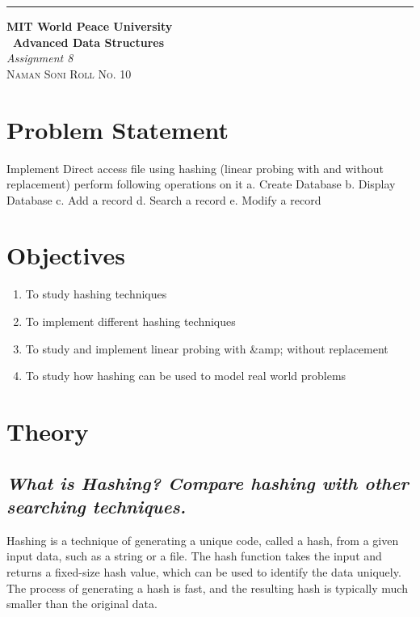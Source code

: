 \documentclass{article}
\begin{document}
\begin{titlepage} %
	
	\raggedleft\rule{1pt}{\textheight} %
	\hspace{0.05\textwidth} %
	\parbox[b]{0.75\textwidth}
	{ %
		
		{\Huge\bfseries MIT World Peace University \\[0.5\baselineskip] \ Advanced Data Structures}\\[2\baselineskip] %
		{\large\textit{Assignment 8}}\\[4\baselineskip] %
		{\Large\textsc{Naman Soni Roll No. 10}} %
		
		\vspace{0.5\textheight} %
	}
	
\end{titlepage}
\tableofcontents
\pagebreak
\section{\textbf{Problem Statement}}
Implement Direct access file using hashing (linear probing with and without
replacement) perform following operations on it a. Create Database b. Display
Database c. Add a record d. Search a record e. Modify a record
\section{\textbf{Objectives}}
\begin{enumerate}
	\item To study hashing techniques
	\item To implement different hashing techniques
	\item To study and implement linear probing with &amp; without replacement
	\item To study how hashing can be used to model real world problems
\end{enumerate}
\section{\textbf{Theory}}
\subsection{\textit{What is Hashing? Compare hashing with other searching techniques.}}
Hashing is a technique of generating a unique code, called a hash, from a given input data, such as a string or a file. The hash function takes the input and returns a fixed-size hash value, which can be used to identify the data uniquely. The process of generating a hash is fast, and the resulting hash is typically much smaller than the original data.\\
\end{document}
